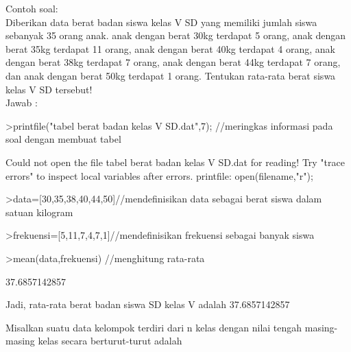 \documentclass[a4paper,10pt]{article}
\begin{document}
\begin{eulernotebook}
\begin{eulercomment}
\begin{eulercomment}
\begin{eulercomment}
\begin{eulercomment}
\begin{eulercomment}
\begin{eulercomment}
\begin{eulercomment}
\begin{eulercomment}
\begin{eulercomment}
\begin{eulercomment}
\begin{eulercomment}
\begin{eulercomment}
\begin{eulercomment}
\begin{eulercomment}
\begin{eulercomment}
Contoh soal:\\
Diberikan data berat badan siswa kelas V SD yang memiliki jumlah siswa
sebanyak 35 orang anak. anak dengan berat 30kg terdapat 5 orang, anak
dengan berat 35kg terdapat 11 orang, anak dengan berat 40kg terdapat 4
orang, anak dengan berat 38kg terdapat 7 orang, anak dengan berat 44kg
terdapat 7 orang, dan anak dengan berat 50kg terdapat 1 orang.
Tentukan rata-rata berat siswa kelas V SD tersebut!\\
Jawab :
\end{eulercomment}
\begin{eulerprompt}
>printfile("tabel berat badan kelas V SD.dat",7); //meringkas informasi pada soal dengan membuat tabel
\end{eulerprompt}
\begin{euleroutput}
  Could not open the file
  tabel berat badan kelas V SD.dat
  for reading!
  Try "trace errors" to inspect local variables after errors.
  printfile:
      open(filename,"r");
\end{euleroutput}
\begin{eulerprompt}
>data=[30,35,38,40,44,50]//mendefinisikan data sebagai berat siswa dalam satuan kilogram
\end{eulerprompt}
\begin{euleroutput}
  [30,  35,  38,  40,  44,  50]
\end{euleroutput}
\begin{eulerprompt}
>frekuensi=[5,11,7,4,7,1]//mendefinisikan frekuensi sebagai banyak siswa
\end{eulerprompt}
\begin{euleroutput}
  [5,  11,  7,  4,  7,  1]
\end{euleroutput}
\begin{eulerprompt}
>mean(data,frekuensi) //menghitung rata-rata
\end{eulerprompt}
\begin{euleroutput}
  37.6857142857
\end{euleroutput}
\begin{eulercomment}
Jadi, rata-rata berat badan siswa SD kelas V adalah 37.6857142857
\end{eulercomment}
\begin{eulercomment}
Misalkan suatu data kelompok terdiri dari n kelas dengan nilai tengah
masing-masing kelas secara berturut-turut adalah\\
\end{eulercomment}
\begin{eulerformula}

\end{eulerformula}
\end{eulercomment}
\end{eulercomment}
\end{eulercomment}
\end{eulercomment}
\end{eulercomment}
\end{eulercomment}
\end{eulercomment}
\end{eulercomment}
\end{eulercomment}
\end{eulercomment}
\end{eulercomment}
\end{eulercomment}
\end{eulercomment}
\end{eulercomment}
\end{eulernotebook}
\end{document}
